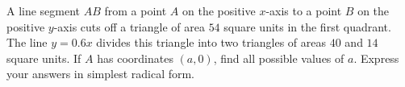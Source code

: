 A line segment $AB$ from a point $A$ on the positive $x$-axis to a point $B$ on the positive $y$-axis cuts off a triangle of area $54$ square units in the first quadrant. The line $y=0.6x$ divides this triangle into two triangles of areas $40$ and $14$ square units. If $A$ has coordinates $(a,0)$, find all possible values of $a$. Express your answers in simplest radical form.
